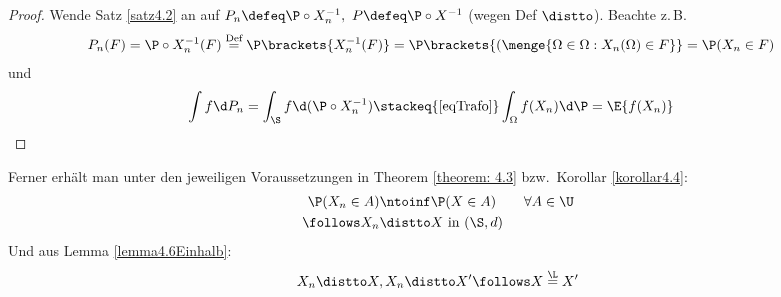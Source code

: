 \begin{proof}
	Wende Satz \ref{satz4.2} an auf $P_n\defeq\P\circ X^{-1}_n,~P\defeq\P\circ X^{-1}$ (wegen Def $\distto $).
	Beachte z.\,B.
	\begin{align*}
		P_n(F)&=\P\circ X^{-1}_n(F)
		\overset{\text{Def}}=
		\P\brackets{X_n^{-1}(F)}
		=\P\brackets{(\menge{\Omega\in\Omega:X_n(\Omega)\in F}}
		=\P(X_n\in F)
	\end{align*}
	und
	\begin{align*}
		\int f\d P_n
		=
		\int_{\S} f\d(\P\circ X_n^{-1})
		\stackeq{\eqref{eqTrafo}}
		\int_\Omega f(X_n)\d\P
		=\E{f(X_n)}
		&\qedhere
	\end{align*}
\end{proof}

Ferner erhält man unter den jeweiligen Voraussetzungen in Theorem \ref{theorem: 4.3} bzw.\ Korollar \ref{korollar4.4}:
\begin{align*}
	\P(X_n\in A) &\ntoinf \P(X\in A)\qquad\forall A\in\U\\
	\follows X_n &\distto  X\text{ in }(\S,d)
\end{align*}
Und aus Lemma \ref{lemma4.6Einhalb}:
\begin{align*}
	X_n\distto  X,X_n\distto  X'\follows X\overset{\L}= X'
\end{align*}

